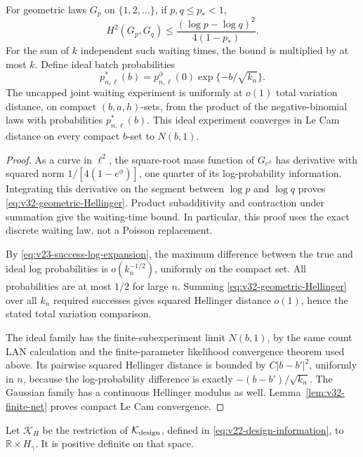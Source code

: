 \begin{lemma}
\label{lem:v32-waiting-Hellinger}
For geometric laws \(G_p\) on \(\{1,2,\ldots\}\), if \(p,q\le p_*<1\),
\begin{equation}\label{eq:v32-geometric-Hellinger}
 H^2(G_p,G_q)\le \frac{(\log p-\log q)^2}{4(1-p_*)}.
\end{equation}
For the sum of \(k\) independent such waiting times, the bound is multiplied
by at most \(k\).  Define ideal batch probabilities
\[
 p^*_{n,\ell}(b)=p^\partial_{n,\ell}(0)\exp\{-b/\sqrt{k_n}\}.
\]
The uncapped joint waiting experiment is uniformly at \(o(1)\) total
variation distance, on compact \((b,a,h)\)-sets, from the product of the
negative-binomial laws with probabilities \(p^*_{n,\ell}(b)\).
This ideal experiment converges in Le Cam distance on every compact
\(b\)-set to \(N(b,1)\).
\end{lemma}

\begin{proof}
As a curve in \(\ell^2\), the square-root mass function of \(G_{e^\phi}\)
has derivative with squared norm \(1/[4(1-e^\phi)]\), one quarter of its
log-probability information.  Integrating this derivative on the segment
between \(\log p\) and \(\log q\) proves
\eqref{eq:v32-geometric-Hellinger}.  Product subadditivity and contraction
under summation give the waiting-time bound.  In particular, this proof uses
the exact discrete waiting law, not a Poisson replacement.

By \eqref{eq:v23-success-log-expansion}, the maximum difference between the
true and ideal log probabilities is \(o(k_n^{-1/2})\), uniformly on the
compact set.  All probabilities are at most \(1/2\) for large \(n\).
Summing \eqref{eq:v32-geometric-Hellinger} over all \(k_n\) required
successes gives squared Hellinger distance \(o(1)\), hence the stated total
variation comparison.

The ideal family has the finite-subexperiment limit \(N(b,1)\), by the same
count LAN calculation and the finite-parameter likelihood convergence
theorem used above.  Its pairwise squared Hellinger distance is bounded by
\(C|b-b'|^2\), uniformly in \(n\), because the log-probability difference
is exactly \(-(b-b')/\sqrt{k_n}\).  The Gaussian family has a continuous
Hellinger modulus as well.  Lemma~\ref{lem:v32-finite-net} proves compact
Le Cam convergence.
\end{proof}

Let \(\mathcal K_H\) be the restriction of
\(\mathcal K_{\rm design}\), defined in
\eqref{eq:v22-design-information}, to \(\mathbb R\times H_\gamma\).
It is positive definite on that space.

